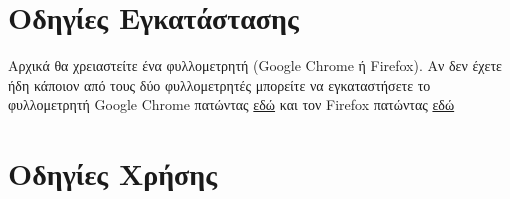 \documentclass{article}
\begin{document}
\section*{Οδηγίες Εγκατάστασης}

Αρχικά θα χρειαστείτε ένα φυλλομετρητή (Google Chrome ή Firefox). Αν δεν έχετε ήδη κάποιον από τους δύο φυλλομετρητές μπορείτε να εγκαταστήσετε το φυλλομετρητή Google Chrome πατώντας \href{https://www.google.com/intl/en_uk/chrome/dr/download/?brand=JJTC&gclid=Cj0KCQjwtsCgBhDEARIsAE7RYh0p-X2d7kNkVFLPkWmugeV2VobmgNNGBRYp2fAA-5cahaJSEYdx50AaAlgwEALw_wcB&gclsrc=aw.ds}{εδώ} και τον Firefox πατώντας \href{https://www.mozilla.org/en-GB/firefox/new/}{εδώ}
\section*{Οδηγίες Χρήσης}
\end{document}
